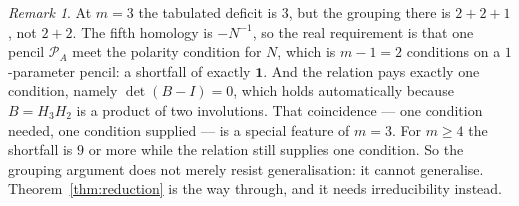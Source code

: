 \documentclass[11pt,a4paper]{article}
\theoremstyle{plain}
\theoremstyle{definition}
\theoremstyle{remark}
\newtheorem{remark}[theorem]{Remark}
\begin{document}
\begin{remark}
At $m=3$ the tabulated deficit is $3$, but the grouping there is $2+2+1$, not
$2+2$. The fifth homology is $-N^{-1}$, so the real requirement is that one pencil
$\mathcal P_A$ meet the polarity condition for $N$, which is $m-1=2$ conditions on a
$1$-parameter pencil: a shortfall of exactly $\mathbf1$. And the relation pays
exactly one condition, namely $\det(B-I)=0$, which holds automatically because
$B=H_3H_2$ is a product of two involutions. That coincidence --- one condition
needed, one condition supplied --- is a special feature of $m=3$. For $m\ge4$ the shortfall is $9$ or more while the
relation still supplies one condition. So the grouping argument does not merely
resist generalisation: it cannot generalise. Theorem~\ref{thm:reduction} is the way
through, and it needs irreducibility instead.
\end{remark}
\end{document}
